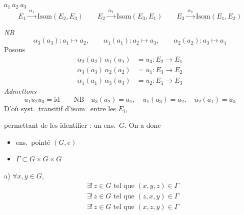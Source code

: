 \documentclass[11pt,a4paper]{article}
\begin{document}
 \qquad $a_1\ a_2\ a_3$
\[
  E_1\xrightarrow{\ \alpha_1\ }\mathrm{Isom}(E_2,E_3)\qquad
  E_2\xrightarrow{\ \alpha_2\ }\mathrm{Isom}(E_3,E_1)\qquad
  E_3\xrightarrow{\ \alpha_3\ }\mathrm{Isom}(E_1,E_2)
\]



\emph{NB}
\[
  \alpha_3(a_3) : a_1\mapsto a_2,\qquad \alpha_1(a_1) : a_2\mapsto a_3,\qquad \alpha_2(a_2) : a_3\mapsto a_1
\]
Posons
\[
  \begin{aligned}
    \alpha_2(a_2)\,\alpha_1(a_1) &= u_3 : E_2\to E_1\\
    \alpha_3(a_3)\,\alpha_2(a_2) &= u_1 : E_3\to E_2\\
    \alpha_1(a_1)\,\alpha_3(a_3) &= u_2 : E_1\to E_3
  \end{aligned}
\]
\emph{Admettons}
\[
  \boxed{u_1u_2u_3=\mathrm{id}}
  \qquad \text{NB}\quad u_3(a_2)=a_1,\quad u_1(a_3)=a_2,\quad u_2(a_1)=a_3
\]
D'où syst.\ transitif d'isom.\ entre les $E_i$,

\struck{\ill{}} permettant de les identifier :  un ens.\ $G$. On a donc
\begin{itemize}
  \item ens.\ pointé $(G,e)$
  \item $\Gamma\subset G\times G\times G$
\end{itemize}
a) $\forall x,y\in G$,
\[
  \begin{aligned}
    &\exists!\,z\in G \text{ tel que } (x,y,z)\in\Gamma\\
    &\exists!\,z\in G \text{ tel que } (z,x,y)\in\Gamma\\
    &\exists!\,z\in G \text{ tel que } (x,z,y)\in\Gamma
  \end{aligned}
\]
\end{document}
